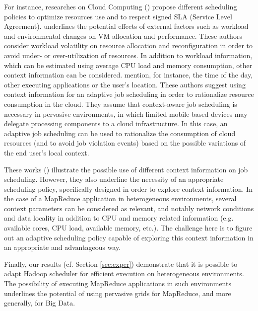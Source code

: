 For instance, researches on Cloud Computing (\cite{Maurer2012, Assuncao2012}) propose different scheduling policies to optimize resources use and to respect signed SLA (Service Level Agreement). \cite{Maurer2012} underlines the potential effects of external factors such as workload and environmental changes on VM allocation and performance. These authors \cite{Maurer2012} consider workload volatility on resource allocation and reconfiguration in order to avoid under- or over-utilization of resources. In addition to workload information, which can be estimated using average CPU load and memory consumption, other context information can be considered. \cite{Assuncao2012} mention, for instance, the time of the day, other executing applications or the user's location. These authors suggest using context information for an adaptive job scheduling in order to rationalize resource consumption in the cloud. They assume that context-aware job scheduling is necessary in pervasive environments, in which limited mobile-based devices may delegate processing components to a cloud infrastructure. In this case, an adaptive job scheduling can be used to rationalize the consumption of cloud resources (and to avoid job violation events) based on the possible variations of the end user's local context. 
 
These works (\cite{Maurer2012, Assuncao2012, Cavallo2015}) illustrate the possible use of different context information on job scheduling. However, they also underline the necessity of an appropriate scheduling policy, specifically designed in order to explore context information. In the case of a MapReduce application in heterogeneous environments, several context parameters can be considered as relevant, and notably network conditions and data locality in addition to CPU and memory related information (e.g. available cores, CPU load, available memory, etc.). The challenge here is to figure out an adaptive scheduling policy capable of exploring this context information in an appropriate and advantageous way.  

Finally, our results (cf. Section \ref{sec:exper}) demonstrate that it is possible to adapt Hadoop scheduler for efficient execution on heterogeneous environments. The possibility of executing MapReduce applications in such environments underlines the potential of using pervasive grids for MapReduce, and more generally, for Big Data. 

